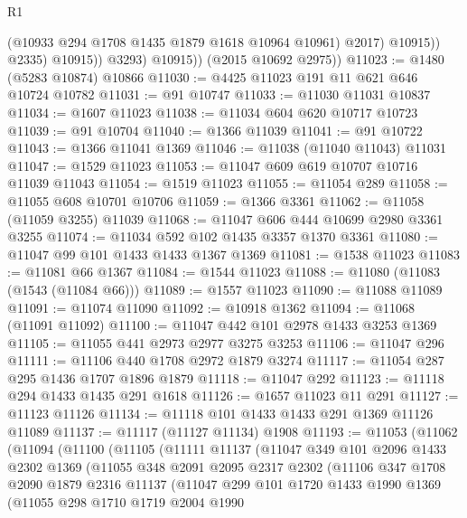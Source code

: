 \begin{lexlean}{R1}
\begin{coremodule}
                        (@10933 @294 @1708 @1435 @1879 @1618 @10964 @10961)
                        @2017)
                      @10915))
                  @2335)
                @10915))
            @3293)
          @10915))
      (@2015 @10692 @2975))
@11023 := @1480 (@5283 @10874) @10866
@11030 := @4425 @11023 @191 @11 @621 @646 @10724 @10782
@11031 := @91 @10747
@11033 := @11030 @11031 @10837
@11034 := @1607 @11023
@11038 := @11034 @604 @620 @10717 @10723
@11039 := @91 @10704
@11040 := @1366 @11039
@11041 := @91 @10722
@11043 := @1366 @11041 @1369
@11046 := @11038 (@11040 @11043) @11031
@11047 := @1529 @11023
@11053 := @11047 @609 @619 @10707 @10716 @11039 @11043
@11054 := @1519 @11023
@11055 := @11054 @289
@11058 := @11055 @608 @10701 @10706
@11059 := @1366 @3361
@11062 := @11058 (@11059 @3255) @11039
@11068 := @11047 @606 @444 @10699 @2980 @3361 @3255
@11074 := @11034 @592 @102 @1435 @3357 @1370 @3361
@11080 := @11047 @99 @101 @1433 @1433 @1367 @1369
@11081 := @1538 @11023
@11083 := @11081 @66 @1367
@11084 := @1544 @11023
@11088 := @11080 (@11083 (@1543 (@11084 @66)))
@11089 := @1557 @11023
@11090 := @11088 @11089
@11091 := @11074 @11090
@11092 := @10918 @1362
@11094 := @11068 (@11091 @11092)
@11100 := @11047 @442 @101 @2978 @1433 @3253 @1369
@11105 := @11055 @441 @2973 @2977 @3275 @3253
@11106 := @11047 @296
@11111 := @11106 @440 @1708 @2972 @1879 @3274
@11117 := @11054 @287 @295 @1436 @1707 @1896 @1879
@11118 := @11047 @292
@11123 := @11118 @294 @1433 @1435 @291 @1618
@11126 := @1657 @11023 @11 @291
@11127 := @11123 @11126
@11134 := @11118 @101 @1433 @1433 @291 @1369 @11126 @11089
@11137 := @11117 (@11127 @11134) @1908
@11193 := @11053
    (@11062
      (@11094
        (@11100
          (@11105
            (@11111
              @11137
              (@11047
                @349
                @101
                @2096
                @1433
                @2302
                @1369
                (@11055
                  @348
                  @2091
                  @2095
                  @2317
                  @2302
                  (@11106
                    @347
                    @1708
                    @2090
                    @1879
                    @2316
                    @11137
                    (@11047
                      @299
                      @101
                      @1720
                      @1433
                      @1990
                      @1369
                      (@11055
                        @298
                        @1710
                        @1719
                        @2004
                        @1990

\end{coremodule}
\end{lexlean}
